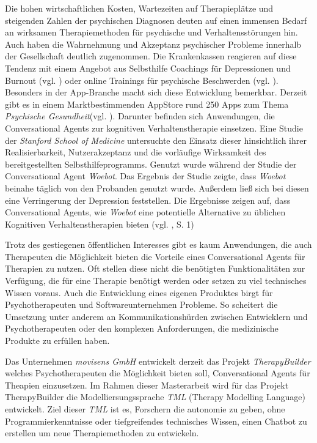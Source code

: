 Die hohen wirtschaftlichen Kosten, Wartezeiten auf Therapieplätze und steigenden Zahlen der psychischen Diagnosen deuten auf einen immensen Bedarf an wirksamen Therapiemethoden für psychische und Verhaltensstörungen hin. Auch haben die Wahrnehmung und Akzeptanz psychischer Probleme innerhalb der Gesellschaft deutlich zugenommen. Die Krankenkassen reagieren auf diese Tendenz mit einem Angebot aus Selbsthilfe Coachings für Depressionen und Burnout (vgl. \cite{Hilfebei71:online} \cite{TKDepres18:online}) oder online Trainings für psychische Beschwerden (vgl. \cite{PROMIND78:online}). Besonders in der App-Branche macht sich diese Entwicklung bemerkbar. Derzeit gibt es in einem Marktbestimmenden AppStore rund 250 Apps zum Thema \emph{Psychische Gesundheit}(vgl.  \cite{psychisc90:online}). Darunter befinden sich Anwendungen, die Conversational Agents zur kognitiven Verhaltenstherapie einsetzen. Eine Studie der \emph{Stanford School of Medicine} untersuchte den Einsatz dieser hinsichtlich ihrer Realisierbarkeit, Nutzerakzeptanz und die vorläufige Wirksamkeit des bereitgestellten Selbsthilfeprogramms. Genutzt wurde während der Studie der Conversational Agent \emph{Woebot}. Das Ergebnis der Studie zeigte, dass \emph{Woebot} beinahe täglich von den Probanden genutzt wurde. Außerdem ließ sich bei diesen eine Verringerung der Depression feststellen. Die Ergebnisse zeigen auf, dass Conversational Agents, wie \emph{Woebot} eine potentielle Alternative zu üblichen Kognitiven Verhaltenstherapien bieten (vgl. \cite{Hany1997}, S. 1) 

Trotz des gestiegenen öffentlichen Interesses  gibt es kaum Anwendungen, die auch Therapeuten die Möglichkeit bieten die Vorteile eines Conversational Agents für Therapien zu nutzen. Oft stellen diese nicht die benötigten Funktionalitäten zur Verfügung, die für eine Therapie benötigt werden oder setzen zu viel technisches Wissen voraus. Auch die Entwicklung eines eigenen Produktes birgt für Psychotherapeuten und Softwareunternehmen Probleme. So scheitert die Umsetzung unter anderem an Kommunikationshürden zwischen Entwicklern und Psychotherapeuten oder den komplexen Anforderungen, die medizinische Produkte zu erfüllen haben. 

Das Unternehmen \emph{movisens GmbH} entwickelt derzeit das Projekt \emph{TherapyBuilder} welches Psychotherapeuten die Möglichkeit bieten soll, Conversational Agents für Theapien einzusetzen. Im Rahmen dieser Masterarbeit wird für das Projekt TherapyBuilder die Modelliersungssprache \emph{TML} (Therapy Modelling Language) entwickelt. Ziel dieser \emph{TML} ist es, Forschern die autonomie zu geben, ohne Programmierkenntnisse oder tiefgreifendes technisches Wissen, einen Chatbot zu erstellen um neue Therapiemethoden zu entwickeln.



